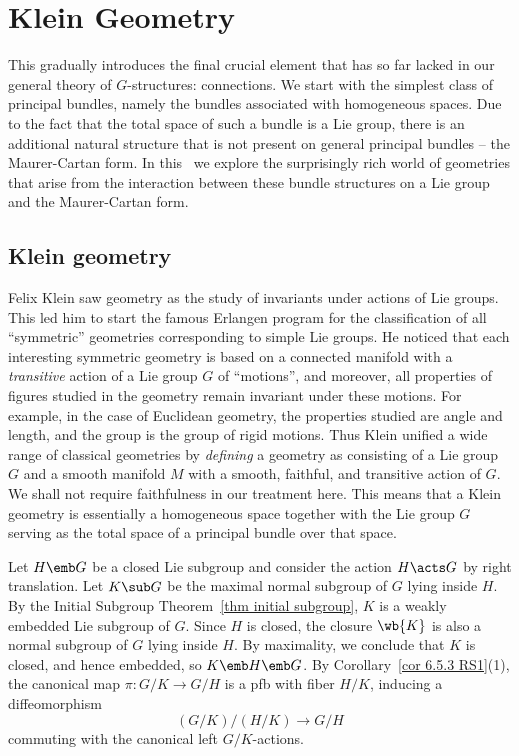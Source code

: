 \chapter{Klein Geometry}\label{chap: Klein geom}

This \partt{} gradually introduces the final crucial element that has so far lacked in our general theory of $G$-structures: connections. We start with the simplest class of principal bundles, namely the bundles associated with homogeneous spaces. Due to the fact that the total space of such a bundle is a Lie group, there is an additional natural structure that is not present on general principal bundles -- the Maurer-Cartan form. In this \chap\ we explore the surprisingly rich world of geometries that arise from the interaction between these bundle structures on a Lie group and the Maurer-Cartan form.



\section{Klein geometry}

Felix Klein saw geometry as the study of invariants under actions of Lie groups. This led him to start the famous Erlangen program for the classification of all ``symmetric'' geometries corresponding to simple Lie groups. He noticed that each interesting symmetric geometry is based on a connected manifold with a \emph{transitive} action of a Lie group $G$ of ``motions'', and moreover, all properties of figures studied in the geometry remain invariant under these motions. For example, in the case of Euclidean geometry, the properties studied are angle and length, and the group is the group of rigid motions. Thus Klein unified a wide range of classical geometries by \emph{defining} a geometry as consisting of a Lie group $G$ and a smooth manifold $M$ with a smooth, faithful, and transitive action of $G$. We shall not require faithfulness in our treatment here. This means that a Klein geometry is essentially a homogeneous space together with the Lie group $G$ serving as the total space of a principal bundle over that space.

Let $H\emb G$ be a closed Lie subgroup and consider the action $H\acts G$ by right translation. Let $K\sub G$ be the maximal normal subgroup of $G$ lying inside $H$. By the Initial Subgroup Theorem~\ref{thm initial subgroup}, $K$ is a weakly embedded Lie subgroup of $G$. Since $H$ is closed, the closure $\wb{K}$ is also a normal subgroup of $G$ lying inside $H$. By maximality, we conclude that $K$ is closed, and hence embedded, so $K\emb H\emb G$. By Corollary~\ref{cor 6.5.3 RS1}(1), the canonical map $\pi:G\slash K\to G\slash H$ is a \gls{pfb} with fiber $H\slash K$, inducing a diffeomorphism
\[(G\slash K)\slash (H\slash K)\to G\slash H\]
commuting with the canonical left $G\slash K$-actions.


